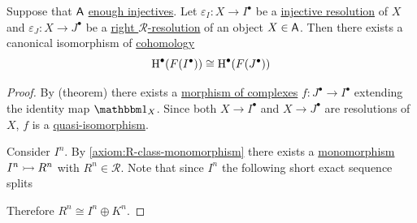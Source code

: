 \documentclass[../../../main]{subfiles}
\begin{document}
\begin{theorem}\label{thm:injective-and-R-adapted-resolutions}
  Suppose that \(\mathsf{A}\) \hyperref[def:enough-injective-projective-objects]{enough injectives}.
  Let \(\varepsilon_{I}: X \to I^{\bullet}\) be a \hyperref[def:injective-projective-resolution]{injective resolution} of \(X\) and \(\varepsilon_{J}: X \to J^{\bullet}\) be a \hyperref[def:right-R-resolution]{right \(\mathcal{R}\)-resolution} of an object \(X \in \mathsf{A}\).
  Then there exists a canonical isomorphism of \hyperref[def:cohomology]{cohomology}
  \begin{equation*}
    \operatorname{H}^{\bullet}(F(I^{\bullet})) \cong \operatorname{H}^{\bullet}(F(J^{\bullet}))
  \end{equation*}
\end{theorem}
\begin{proof}
  By (theorem) there exists a \hyperref[def:complex-morphism]{morphism of complexes} \(f: J^{\bullet} \to I^{\bullet}\) extending the identity map \(\id_{X}\).
  Since both \(X \to I^{\bullet}\) and \(X \to J^{\bullet}\) are resolutions of \(X\), \(f\) is a \hyperref[def:quasi-isomorphism]{quasi-isomorphism}.

  Consider \(I^{n}\).
  By \ref{axiom:R-class-monomorphism} there exists a \hyperref[def:mono-epi-morphism]{monomorphism} \(I^{n} \rightarrowtail R^{n}\) with \(R^{n} \in \mathcal{R}\).
  Note that {\color{red} since \(I^{n}\) the following short exact sequence splits}
  \begin{center}
  \end{center}
  Therefore \(R^{n} \cong I^{n} \oplus K^{n}\).
\end{proof}
\end{document}
